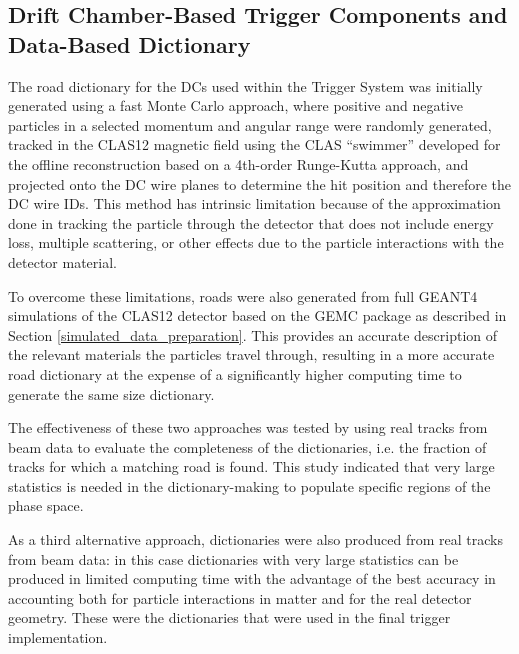 
\subsection{Drift Chamber-Based Trigger Components and Data-Based Dictionary}
\label{dc_dictionary}

The road dictionary for the DCs used within the Trigger System was initially generated using a fast Monte Carlo approach, where positive and negative particles in a selected momentum and angular range were randomly generated, tracked in the CLAS12 magnetic field using the CLAS ``swimmer'' developed for the offline reconstruction based on a 4th-order Runge-Kutta approach, and projected onto the DC wire planes to determine the hit position and therefore the DC wire IDs. This method has intrinsic limitation because of the approximation done in tracking the particle through the detector that does not include energy loss, multiple scattering, or other effects due to the particle interactions with the detector material.

To overcome these limitations, roads were also generated from full GEANT4 simulations of the CLAS12 detector based on the GEMC package as described in Section \ref{simulated_data_preparation}. This provides an accurate description of the relevant materials the particles travel through, resulting in a more accurate road dictionary at the expense of a significantly higher computing time to generate the same size dictionary.

The effectiveness of these two approaches was tested by using real tracks from beam data to evaluate the completeness of the dictionaries, i.e. the fraction of tracks for which a matching road is found. This study indicated that very large statistics is needed in the dictionary-making to populate specific regions of the phase space.

As a third alternative approach, dictionaries were also produced from real tracks from beam data: in this case dictionaries with very large statistics can be produced in limited computing time with the advantage of the best accuracy in accounting both for particle interactions in matter and for the real detector geometry. These were the dictionaries that were used in the final trigger implementation.

